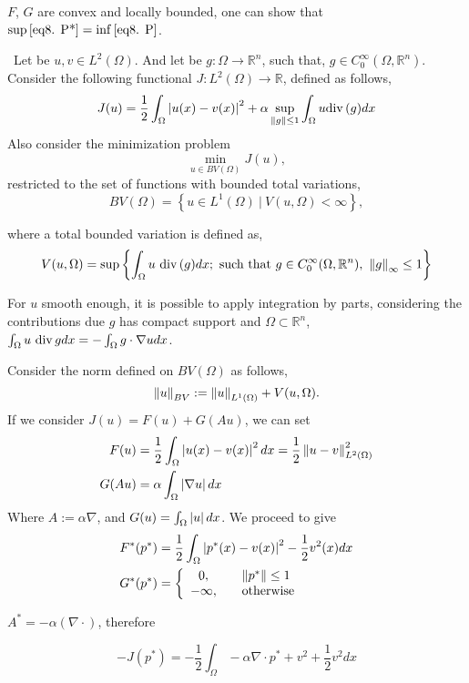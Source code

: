 $F$, $G$ are convex and locally bounded, one can show that 
$\sup\eqref{eq8. P*}=\inf\eqref{eq8. P}$.
\begin{example}
\	
Let be $u, v \in L^2(\Omega)$. And let be $g: \Omega\rightarrow \mathbb{R}^n$, such that, $g\in C_0^\infty(\Omega, \mathbb{R}^n)$. Consider the following functional $J: L^2(\Omega) \rightarrow \mathbb{R}$, defined as follows,
	\begin{equation*}
		J(u)=\frac{1}{2} \int_{\Omega}\left|u(x)-v(x)\right|^2+\alpha \sup_{\left\lVert g\right\rVert\leq 1} \int_{\Omega} u \mathrm{div\,} (g) dx
	\end{equation*}
	Also consider the minimization problem \[\min_{u\in BV(\Omega)} J(u),\] 
	restricted to the set of functions with bounded total variations,
	\[BV(\Omega)=\left\lbrace u\in L^1(\Omega) \ | \ V(u, \Omega) < \infty\right\rbrace,\]
	
	where a total bounded variation is defined as,
	\begin{equation*}
		V(u, \Omega)=\sup\left\lbrace 
		 \int_{\Omega} u\ \mathrm{div\,} (g) dx;  \ \text{such that} \ g \in C_0^\infty (\Omega, \mathbb{R}^n), \  \left\lVert g\right\rVert_\infty \leq 1
		\right\rbrace
	\end{equation*}

	 \begin{remark}
	 For $u$ smooth enough, it is possible to apply integration by parts, considering the contributions due $g$ has compact support and $\Omega\subset \mathbb{R}^n$, $\int_{\Omega} u\ \mathrm{div\,} g dx = -\int_{\Omega} g\cdot \nabla u  dx$.
	 \end{remark}

	Consider the norm defined on $BV(\Omega)$ as follows,	
		\[\left\lVert u\right\rVert_{BV}:= \left\lVert u\right\rVert_{L^1(\Omega)}+V(u, \Omega).\]
	If we consider $J(u)=F(u)+G(Au)$, we can set
	\begin{align*}
		F(u)&=\frac{1}{2}\int_{\Omega} \left|u(x)-v(x)\right|^2 dx = \frac{1}{2}\left\lVert u-v\right\rVert_{L^2(\Omega)}^2 \\
		G(Au)&=\alpha\int_{\Omega} \left|\nabla u\right|dx
	\end{align*}
	 Where $A:=\alpha \nabla$, and $G(u)=\int_{\Omega} \left|u\right|dx$. We proceed to give 
	\begin{align*}
		F^*(p^*)&=\frac{1}{2} \int_{\Omega}\left|p^*(x)-v(x)\right| ^2 -\frac{1}{2} v^2(x) dx
\\
G^*(p^*) &={\left\lbrace 
	\begin{array}{cl}
		0, &\quad \left\lVert p^*\right\rVert \leq 1 \\
	-\infty, &\quad \text{otherwise}
	\end{array}
	\right.} 
	\end{align*}
	
	$A^*=-\alpha (\nabla\cdot)$, therefore
	
	\[-J(p^*)=-\frac{1}{2} \int_{\Omega} -\alpha \nabla\cdot p^* + v^2+ \frac{1}{2} v^2 dx\]
\end{example}

